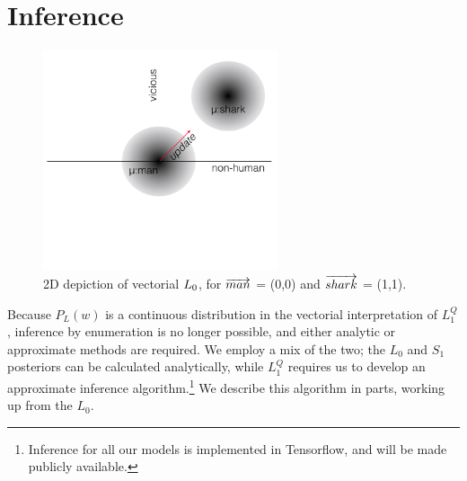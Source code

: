 \documentclass[OpenMind]{stjour}
\newcommand{\Listener}{L}
\newcommand{\QLONE}{\Listener_{{1}}^{{Q}}}
\begin{document}
\section{Inference} \label{technicaloverview}

	\begin{figure}[htbp]
	\centering
	\includegraphics[height=6.5cm]{images/diagram1.png}
	   
	  \caption{2D depiction of vectorial $L\protect_0$, for $\protect\overrightarrow{man}$ = (0,0) and $\protect\overrightarrow{shark}$ = (1,1).}
	  \label{fig:2d}
	\end{figure}

	Because $P_L(w)$ is a continuous distribution in the vectorial interpretation of $\QLONE$, inference by enumeration is no longer possible, and either analytic or approximate methods are required. We employ a mix of the two; the $L_0$ and $S_1$ posteriors can be calculated analytically, while $\QLONE$ requires us to develop an approximate inference algorithm.\footnote{Inference for all our models is implemented in Tensorflow, and will be made publicly available.} We describe this algorithm in parts, working up from the $L_0$.


\end{document}

